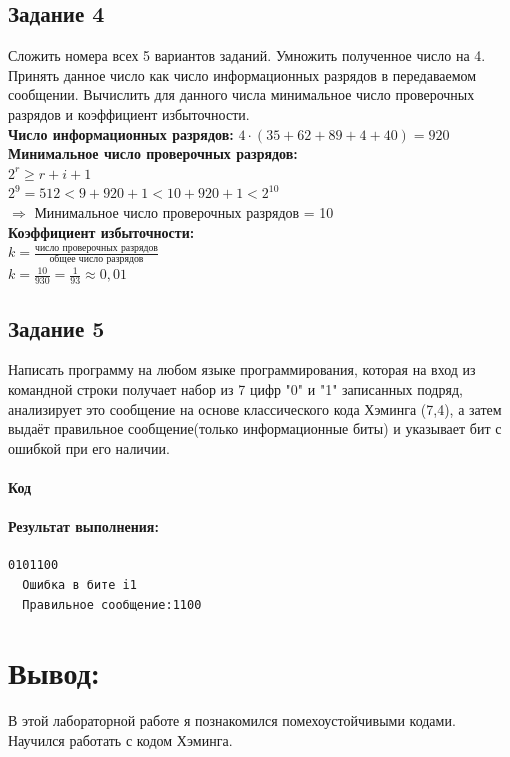 \documentclass[12pt,onecolumn]{article}
\begin{document}
\begin{flushleft}
\subsection{Задание 4}
Сложить номера всех 5 вариантов заданий. Умножить полученное число на 4. Принять данное число как число информационных разрядов
в передаваемом сообщении. Вычислить для данного числа минимальное число проверочных разрядов и коэффициент избыточности.\\
\hfill \break
\textbf{Число информационных разрядов:} $4\cdot(35+62+89+4+40)=920$\\
\textbf{Минимальное число проверочных разрядов:}\\
$2^r \geq r + i + 1$\\
$2^9 = 512 < 9 + 920 + 1 < 10 + 920 + 1 < 2^{10}$\\
$\Rightarrow $ Минимальное число проверочных разрядов = 10\\
\textbf{Коэффициент избыточности:}\\
\hfill \break
$k = \frac{\text{число проверочных разрядов}}{\text{общее число разрядов}}$\\
$k = \frac{10}{930}=\frac{1}{93} \approx 0,01 $
\newpage
\subsection{Задание 5}
Написать программу на любом языке программирования, которая на вход из командной строки получает набор из 7 цифр "0" и "1" записанных подряд, анализирует это сообщение на основе классического кода Хэминга (7,4), а затем выдаёт
правильное сообщение(только информационные биты) и указывает бит с ошибкой при его наличии.
\paragraph{Код}
\hfill \break
{}

\paragraph{Результат выполнения:}
\hfill \break
\begin{lstlisting}[basicstyle=\ttfamily\fontsize{12pt}{12pt}\selectfont]
  0101100
  Ошибка в бите i1
  Правильное сообщение:1100  
\end{lstlisting}
\section{Вывод:}
В этой лабораторной работе я познакомился помехоустойчивыми кодами. Научился работать с кодом Хэминга.
\end{flushleft}
\end{document}
